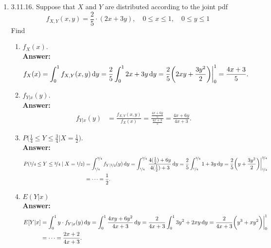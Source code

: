 \documentclass{article}
\begin{document}
\begin{enumerate}
        \item 3.11.16. Suppose that $X$ and $Y$ are distributed according to the joint pdf
            \[f_{X,Y}(x,y) = \frac{2}{5} \cdot (2x+3y), \quad 0 \leq x \leq 1, \quad 0 \leq y \leq 1\]
        Find
        \begin{enumerate}
            \item $f_X(x)$.\\
            \textbf{Answer: }
                \begin{align*}
                    f_X(x) &= \int_0^1 f_{X,Y}(x,y) \dif y = \frac{2}{5} \int_0^1 2x+3y \dif y = \frac{2}{5}\bigg(2xy+\frac{3y^2}{2}\bigg)\bigg|_0^1 = \frac{4x+3}{5}.
                \end{align*}
            
            \item $f_{Y|x}(y)$.\\
            \textbf{Answer: }
                \begin{align*}
                    f_{Y|x}(y) &= \frac{f_{X,Y}(x,y)}{f_X(x)} = \frac{\frac{4x+6y}{5}}{\frac{4x+3}{5}} = \frac{4x+6y}{4x+3}.
                \end{align*}
            
            \item $P\big(\frac{1}{4} \leq Y \leq \frac{3}{4}|X = \frac{1}{2}\big)$.\\
            \textbf{Answer: }
                \begin{align*}
                    P(\nicefrac{1}{4} \leq Y \leq \nicefrac{3}{4} \;| \; X = \nicefrac{1}{2}) &= \int_{\nicefrac{1}{4}}^{\nicefrac{3}{4}} f_{Y|\nicefrac{1}{2}}(y) \dif y = \int_{\nicefrac{1}{4}}^{\nicefrac{3}{4}} \frac{4(\frac{1}{2})+6y}{4(\frac{1}{2})+3} \dif y = \frac{2}{5} \int_{\nicefrac{1}{4}}^{\nicefrac{3}{4}} 1+3y \dif y = \frac{2}{5}\bigg(y+\frac{3y^2}{2}\bigg)\bigg|_{\nicefrac{1}{4}}^{\nicefrac{3}{4}}\\
                    &= \cdots = \frac{1}{2}.
                \end{align*}
            
            \item $E(Y|x)$\\
            \textbf{Answer: }
                \begin{align*}
                    E[Y|x] &= \int_0^1 y \cdot f_{Y|x}(y) \dif y = \int_0^1 \frac{4xy+6y^2}{4x+3} \dif y = \frac{2}{4x+3}\int_0^1 3y^2+2xy \dif y = \frac{2}{4x+3}\bigg(y^3+xy^2\bigg)\bigg|_0^1\\
                    &= \cdots = \frac{2x+2}{4x+3}.
                \end{align*}
        \end{enumerate}


\end{enumerate}
\end{document}
